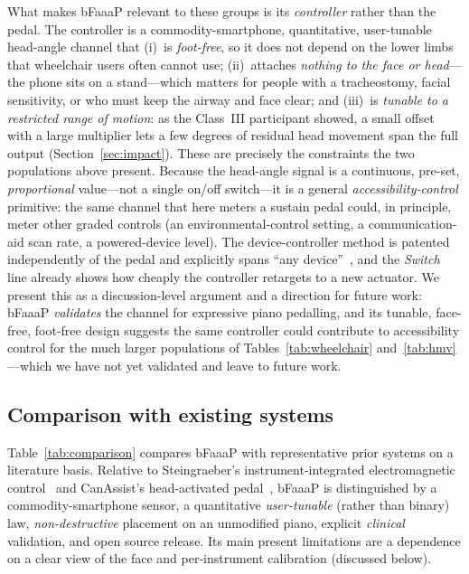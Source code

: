 What makes bFaaaP relevant to these groups is its \emph{controller} rather than the pedal.
The controller is a commodity-smartphone, quantitative, user-tunable head-angle channel
that (i)~is \emph{foot-free}, so it does not depend on the lower limbs that wheelchair users
often cannot use; (ii)~attaches \emph{nothing to the face or head}---the phone sits on a
stand---which matters for people with a tracheostomy, facial sensitivity, or who must keep
the airway and face clear; and (iii)~is \emph{tunable to a restricted range of motion}: as
the Class~III participant showed, a small offset with a large multiplier lets a few degrees
of residual head movement span the full output (Section~\ref{sec:impact}). These are
precisely the constraints the two populations above present. Because the head-angle signal
is a continuous, pre-set, \emph{proportional} value---not a single on/off switch---it is a
general \emph{accessibility-control} primitive: the same channel that here meters a sustain
pedal could, in principle, meter other graded controls (an environmental-control setting, a
communication-aid scan rate, a powered-device level). The device-controller method is
patented independently of the pedal and explicitly spans ``any device''~\cite{jp7004771},
and the \emph{Switch} line already shows how cheaply the controller retargets to a new
actuator. We present this as a discussion-level argument and a direction for future work:
bFaaaP \emph{validates} the channel for expressive piano pedalling, and its tunable,
face-free, foot-free design suggests the same controller could contribute to accessibility
control for the much larger populations of Tables~\ref{tab:wheelchair}
and~\ref{tab:hmv}---which we have not yet validated and leave to future work.

\subsection{Comparison with existing systems}
Table~\ref{tab:comparison} compares bFaaaP with representative prior systems on a
literature basis. Relative to Steingraeber's instrument-integrated electromagnetic
control~\cite{steingraeber,mouthpedal2008} and CanAssist's head-activated
pedal~\cite{canassist}, bFaaaP is distinguished by a commodity-smartphone sensor,
a quantitative \emph{user-tunable} (rather than binary) law, \emph{non-destructive}
placement on an unmodified piano, explicit \emph{clinical} validation, and open
source release. Its main present limitations are a dependence on a clear view of
the face and per-instrument calibration (discussed below).


